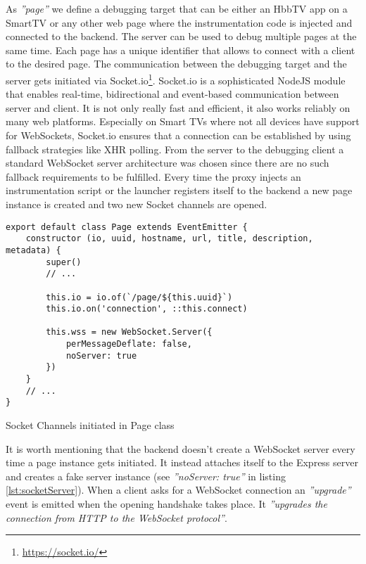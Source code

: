 As \textit{''page''} we define a debugging target that can be either an HbbTV app on a SmartTV or
any other web page where the instrumentation code is injected and connected to the backend. The
server can be used to debug multiple pages at the same time. Each page has a unique identifier
that allows to connect with a client to the desired page. The communication between the debugging target
and the server gets initiated via Socket.io\footnote{\url{https://socket.io/}}. Socket.io is a
sophisticated NodeJS module that enables real-time, bidirectional and event-based communication between
server and client. It is not only really fast and efficient, it also works reliably on many web
platforms. Especially on Smart TVs where not all devices have support for WebSockets, Socket.io
ensures that a connection can be established by using fallback strategies like XHR polling. From
the server to the debugging client a standard WebSocket server architecture was chosen since
there are no such fallback requirements to be fulfilled. Every time the proxy injects an
instrumentation script or the launcher registers itself to the backend a new page instance is created
and two new Socket channels are opened.

\begin{listing}[H]
\begin{verbatim}
export default class Page extends EventEmitter {
    constructor (io, uuid, hostname, url, title, description, metadata) {
        super()
        // ...

        this.io = io.of(`/page/${this.uuid}`)
        this.io.on('connection', ::this.connect)

        this.wss = new WebSocket.Server({
            perMessageDeflate: false,
            noServer: true
        })
    }
    // ...
}
\end{verbatim}
\caption{Socket Channels initiated in Page class}
\label{lst:socketServer}
\end{listing}

It is worth mentioning that the backend doesn't create a WebSocket server every time a page instance
gets initiated. It instead attaches itself to the Express server and creates a fake server instance
(see \textit{''noServer: true''} in listing \ref{lst:socketServer}). When a client asks for a WebSocket connection
an \textit{''upgrade''} event is emitted when the opening handshake takes place. It \textit{''upgrades
the connection from HTTP to the WebSocket protocol''}\cite{socket}.

